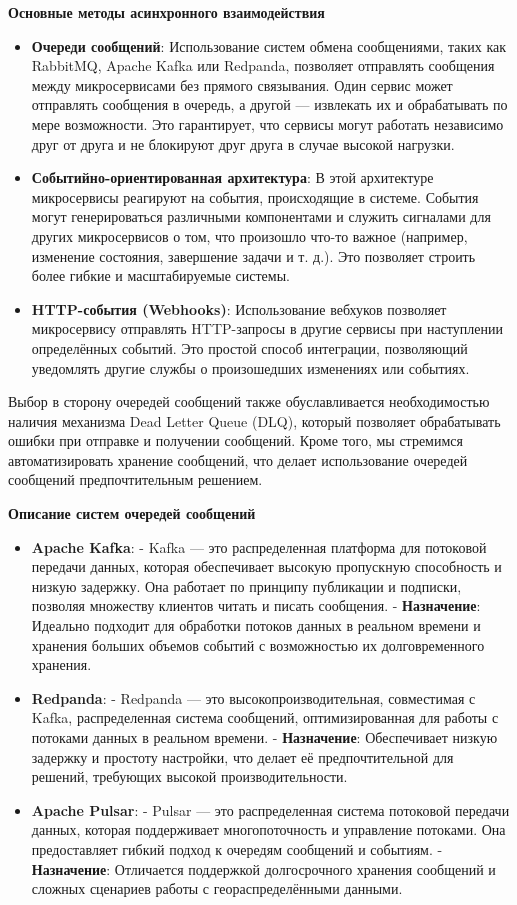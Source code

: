 \textbf{Основные методы асинхронного взаимодействия}
\begin{itemize}
    \item \textbf{Очереди сообщений}: Использование систем обмена сообщениями, таких как RabbitMQ, Apache Kafka или Redpanda, позволяет отправлять сообщения между микросервисами без прямого связывания. Один сервис может отправлять сообщения в очередь, а другой — извлекать их и обрабатывать по мере возможности. Это гарантирует, что сервисы могут работать независимо друг от друга и не блокируют друг друга в случае высокой нагрузки.
    \item \textbf{Событийно-ориентированная архитектура}: В этой архитектуре микросервисы реагируют на события, происходящие в системе. События могут генерироваться различными компонентами и служить сигналами для других микросервисов о том, что произошло что-то важное (например, изменение состояния, завершение задачи и т. д.). Это позволяет строить более гибкие и масштабируемые системы.
    \item \textbf{HTTP-события (Webhooks)}: Использование вебхуков позволяет микросервису отправлять HTTP-запросы в другие сервисы при наступлении определённых событий. Это простой способ интеграции, позволяющий уведомлять другие службы о произошедших изменениях или событиях.
\end{itemize}

Выбор в сторону очередей сообщений также обуславливается необходимостью наличия механизма Dead Letter Queue (DLQ), который позволяет обрабатывать ошибки при отправке и получении сообщений. Кроме того, мы стремимся автоматизировать хранение сообщений, что делает использование очередей сообщений предпочтительным решением.

\textbf{Описание систем очередей сообщений}
\begin{itemize}
    \item \textbf{Apache Kafka}:
            - Kafka — это распределенная платформа для потоковой передачи данных, которая обеспечивает высокую пропускную способность и низкую задержку\cite{kreps2013kafka}. Она работает по принципу публикации и подписки, позволяя множеству клиентов читать и писать сообщения\cite{wortmann2019kafka}.
            - \textbf{Назначение}: Идеально подходит для обработки потоков данных в реальном времени и хранения больших объемов событий с возможностью их долговременного хранения.
    \item \textbf{Redpanda}:
            - Redpanda — это высокопроизводительная, совместимая с Kafka, распределенная система сообщений, оптимизированная для работы с потоками данных в реальном времени.
            - \textbf{Назначение}: Обеспечивает низкую задержку и простоту настройки, что делает её предпочтительной для решений, требующих высокой производительности. 
    \item \textbf{Apache Pulsar}:
            - Pulsar — это распределенная система потоковой передачи данных, которая поддерживает многопоточность и управление потоками. Она предоставляет гибкий подход к очередям сообщений и событиям.
            - \textbf{Назначение}: Отличается поддержкой долгосрочного хранения сообщений и сложных сценариев работы с геораспределёнными данными.
\end{itemize}

